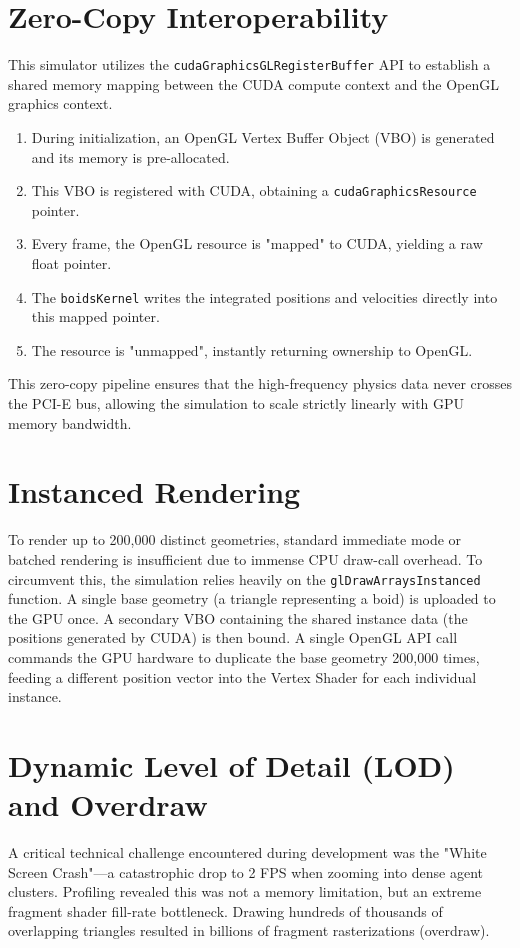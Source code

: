 \documentclass[12pt,a4paper]{report}
\begin{document}
\section{Zero-Copy Interoperability}
This simulator utilizes the \texttt{cudaGraphicsGLRegisterBuffer} API to establish a shared memory mapping between the CUDA compute context and the OpenGL graphics context. 
\begin{enumerate}
    \item During initialization, an OpenGL Vertex Buffer Object (VBO) is generated and its memory is pre-allocated.
    \item This VBO is registered with CUDA, obtaining a \texttt{cudaGraphicsResource} pointer.
    \item Every frame, the OpenGL resource is "mapped" to CUDA, yielding a raw float pointer.
    \item The \texttt{boidsKernel} writes the integrated positions and velocities directly into this mapped pointer.
    \item The resource is "unmapped", instantly returning ownership to OpenGL.
\end{enumerate}
This zero-copy pipeline ensures that the high-frequency physics data never crosses the PCI-E bus, allowing the simulation to scale strictly linearly with GPU memory bandwidth.

\section{Instanced Rendering}
To render up to 200,000 distinct geometries, standard immediate mode or batched rendering is insufficient due to immense CPU draw-call overhead. To circumvent this, the simulation relies heavily on the \texttt{glDrawArraysInstanced} function. A single base geometry (a triangle representing a boid) is uploaded to the GPU once. A secondary VBO containing the shared instance data (the positions generated by CUDA) is then bound. A single OpenGL API call commands the GPU hardware to duplicate the base geometry 200,000 times, feeding a different position vector into the Vertex Shader for each individual instance.

\section{Dynamic Level of Detail (LOD) and Overdraw}
A critical technical challenge encountered during development was the "White Screen Crash"—a catastrophic drop to 2 FPS when zooming into dense agent clusters. Profiling revealed this was not a memory limitation, but an extreme fragment shader fill-rate bottleneck. Drawing hundreds of thousands of overlapping triangles resulted in billions of fragment rasterizations (overdraw).
\end{document}

